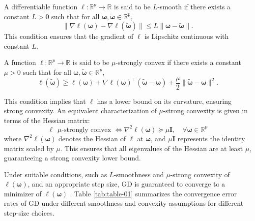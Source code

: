 \begin{definition}
A differentiable function $\ell: \mathbb{R}^p \to \mathbb{R}$ is said to be $L$-smooth if there exists a constant $L > 0$ such that for all $\bm\omega, \bm{\tilde{\omega}} \in \mathbb{R}^p$,\\
\begin{equation} \label{eq:L_smoothness}
    \| \nabla \ell(\bm{\omega}) - \nabla \ell(\bm{\tilde{\omega}}) \| \leq L \| \bm{\omega} - \bm{\tilde{\omega}} \|.
\end{equation}
This condition ensures that the gradient of $\ell$ is Lipschitz continuous with constant $L$.
\end{definition}

\begin{definition}
A function $\ell: \mathbb{R}^p \to \mathbb{R}$ is said to be $\mu$-strongly convex if there exists a constant $\mu > 0$ such that for all $\bm\omega, \bm{\tilde{\omega}} \in \mathbb{R}^p$,\\
\begin{equation} \label{eq:mu_strong_convexity}
    \ell(\bm{\tilde{\omega}}) \geq \ell(\bm\omega) + \nabla \ell(\bm\omega)^{\top}(\bm{\tilde{\omega}} - \bm\omega) + \frac{\mu}{2} \| \bm{\tilde{\omega}} - \bm\omega \|^2.
\end{equation}
\end{definition}
This condition implies that $\ell$ has a lower bound on its curvature, ensuring strong convexity. An equivalent characterization of $\mu$-strong convexity is given in terms of the Hessian matrix:\\
\begin{equation} \label{eq:hessian_characterization}
    \ell ~~ \mu\text{-strongly convex~} \Leftrightarrow \nabla^2 \ell(\bm\omega) \succeq \mu \mathbf{I}, \quad \forall \bm\omega \in \mathbb{R}^p
\end{equation}
where $\nabla^2 \ell(\bm\omega)$ denotes the Hessian of $\ell$ at $\bm\omega$, and $\mu \mathbf{I}$ represents the identity matrix scaled by $\mu$. This ensures that all eigenvalues of the Hessian are at least $\mu$, guaranteeing a strong convexity lower bound.

Under suitable conditions, such as $L$-smoothness and $\mu$-strong convexity of $\ell(\bm\omega)$, and an appropriate step size, GD is guaranteed to converge to a minimizer of $\ell(\bm\omega)$ \cite{garrigos2023handbook}. Table \ref{tab:table-01} summarizes the convergence error rates of GD under different smoothness and convexity assumptions for different step-size choices.

